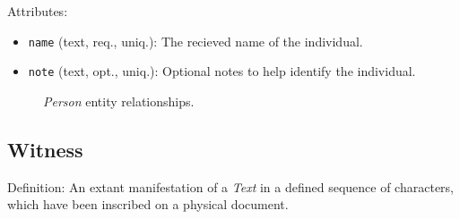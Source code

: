 \vspace{1em}
\noindent Attributes:
\begin{itemize}
    \item \texttt{name} (text, req., uniq.): The recieved name of the individual.
    \item \texttt{note} (text, opt., uniq.): Optional notes to help identify the individual.
\end{itemize}

\begin{figure}[ht]
    \begin{center}
        
    \end{center}
\label{fig:PersonER}
\caption{\textit{Person} entity relationships.}
\end{figure}


\subsection{Witness}

Definition: An extant manifestation of a \textit{Text} in a defined sequence of characters, which have been inscribed on a physical document.


